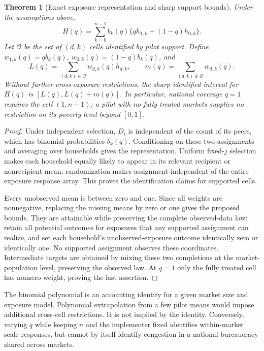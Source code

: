 \documentclass[11pt]{article}
\newtheorem{theorem}{Theorem}
\theoremstyle{remark}
\begin{document}
\begin{theorem}[Exact exposure representation and sharp support bounds]\label{support}
Under the assumptions above,
\[
 H(q)=\sum_{k=0}^{n-1}b_k(q)\{q h_{1,k}+(1-q)h_{0,k}\}.
\]
Let $\mathcal O$ be the set of $(d,k)$ cells identified by pilot support. Define $w_{1,k}(q)=qb_k(q)$, $w_{0,k}(q)=(1-q)b_k(q)$, and
\[
 L(q)=\sum_{(d,k)\in\mathcal O}w_{d,k}(q)h_{d,k},\qquad
 m(q)=\sum_{(d,k)\notin\mathcal O}w_{d,k}(q).
\]
Without further cross-exposure restrictions, the sharp identified interval for $H(q)$ is $[L(q),L(q)+m(q)]$. In particular, national coverage $q=1$ requires the cell $(1,n-1)$; a pilot with no fully treated markets supplies no restriction on its poverty level beyond $[0,1]$.
\end{theorem}
\begin{proof}
Under independent selection, $D_i$ is independent of the count of its peers, which has binomial probabilities $b_k(q)$. Conditioning on these two assignments and averaging over households gives the representation. Uniform fixed-$j$ selection makes each household equally likely to appear in its relevant recipient or nonrecipient mean; randomization makes assignment independent of the entire exposure response array. This proves the identification claims for supported cells.

Every unobserved mean is between zero and one. Since all weights are nonnegative, replacing the missing means by zero or one gives the proposed bounds. They are attainable while preserving the complete observed-data law: retain all potential outcomes for exposures that any supported assignment can realize, and set each household's unobserved-exposure outcome identically zero or identically one. No supported assignment observes these coordinates. Intermediate targets are obtained by mixing these two completions at the market-population level, preserving the observed law. At $q=1$ only the fully treated cell has nonzero weight, proving the last assertion.
\end{proof}

The binomial polynomial is an accounting identity for a given market size and exposure model. Polynomial extrapolation from a few pilot means would impose additional cross-cell restrictions. It is not implied by the identity. Conversely, varying $q$ while keeping $n$ and the implementer fixed identifies within-market scale responses, but cannot by itself identify congestion in a national bureaucracy shared across markets.
\end{document}
